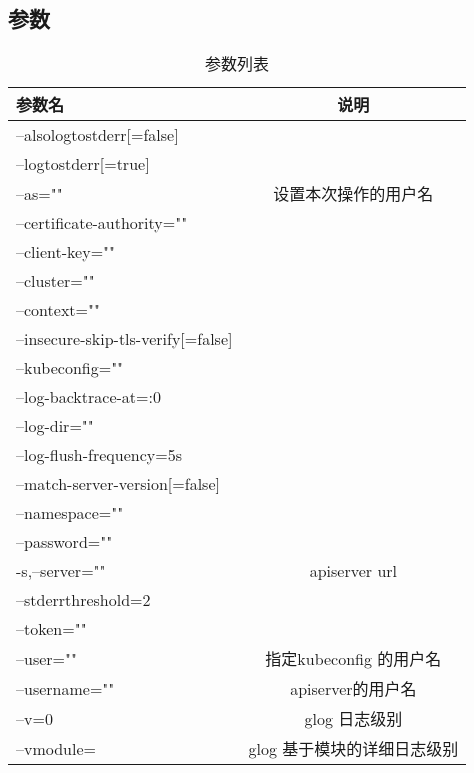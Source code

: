 \documentclass{ctexart}
\begin{document}
\subsection{参数}
\begin{table}[H]
	\centering
	\caption{参数列表}
	\begin{tabular}{|l|c|}
		\hline
		参数名 & 说明 \\\hline
		--alsologtostderr[=false] & \\\hline
		--logtostderr[=true] & \\\hline
		--as="" & 设置本次操作的用户名 \\\hline
		--certificate-authority="" & \\\hline
		--client-key="" & \\\hline
		--cluster="" & \\\hline
		--context="" & \\\hline
		--insecure-skip-tls-verify[=false] & \\\hline
		--kubeconfig="" & \\\hline
		--log-backtrace-at=:0 & \\\hline
		--log-dir="" & \\\hline
		--log-flush-frequency=5s & \\\hline
		--match-server-version[=false] & \\\hline
		--namespace="" & \\\hline
		--password="" & \\\hline
		-s,--server="" & apiserver url \\\hline
		--stderrthreshold=2 & \\\hline
		--token="" & \\\hline
		--user="" & 指定kubeconfig 的用户名 \\\hline
		--username="" & apiserver的用户名 \\\hline
		--v=0 & glog 日志级别 \\\hline
		--vmodule= & glog 基于模块的详细日志级别 \\\hline
		
	\end{tabular}
\end{table}
\end{document}
